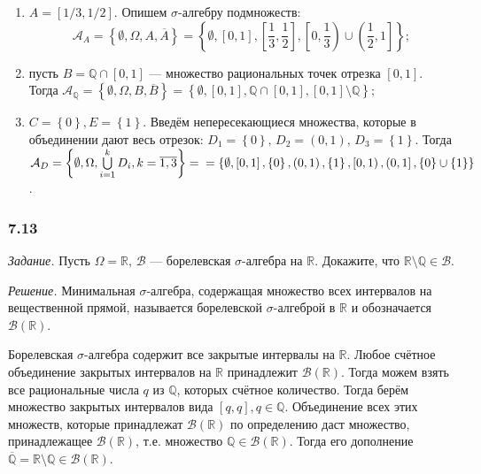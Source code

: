 \begin{enumerate}[label=\alph*)]
\item $A = \left[ 1/3, 1/2 \right] $.
Опишем $ \sigma $-алгебру подмножеств:
$$ \mathcal{A}_A =
\left\{ \emptyset, \Omega, A, \overline{A} \right\} =
\left\{ \emptyset, \left[ 0, 1 \right],
\left[ \frac{1}{3}, \frac{1}{2} \right], \left[ 0, \frac{1}{3} \right) \cup \left( \frac{1}{2}, 1 \right] \right\};$$
\item пусть $B = \mathbb{Q} \cap \left[ 0, 1 \right] $ --- множество рациональных точек отрезка $ \left[ 0, 1 \right] $.
Тогда
$ \mathcal{A}_{ \mathbb{Q} } =
\left\{ \emptyset, \Omega, B, \overline{B} \right\} =
\left\{ \emptyset, \left[ 0, 1 \right], \mathbb{Q} \cap \left[ 0, 1 \right], \left[ 0, 1 \right] \setminus \mathbb{Q} \right\};$
\item $C = \left\{ 0 \right\}, E = \left\{ 1 \right\} $.
Введём непересекающиеся множества,
которые в объединении дают весь отрезок: $D_1 = \left\{ 0 \right\}, \, D_2 = \left( 0, 1 \right), \, D_3 = \left\{ 1 \right\} $.
Тогда
$ \mathcal{A}_D =
\left\{ \emptyset, \Omega, \bigcup \limits_{i=1}^k D_i, k = \overline{1, 3} \right\} = \\
= \left\{ \emptyset, \left[0, 1 \right], \left\{ 0 \right\}, \left( 0, 1 \right),
\left\{ 1 \right\}, \left[0, 1 \right), \left(0, 1 \right], \left\{ 0 \right\} \cup \left\{ 1 \right\} \right\} $.
\end{enumerate}

\subsubsection*{7.13}

\textit{Задание.} Пусть $ \Omega = \mathbb{R}, \, \mathcal{B} $ --- борелевская $ \sigma $-алгебра на $ \mathbb{R} $.
Докажите, что $ \mathbb{R} \setminus \mathbb{Q} \in \mathcal{B} $.

\textit{Решение.} Минимальная $ \sigma $-алгебра,
содержащая множество всех интервалов на вещественной прямой,
называется борелевской $ \sigma $-алгеброй в $ \mathbb{R} $ и обозначается $ \mathcal{B} \left( \mathbb{R} \right) $.

Борелевская $ \sigma $-алгебра содержит все закрытые интервалы на $ \mathbb{R} $.
Любое счётное объединение закрытых интервалов на $ \mathbb{R} $ принадлежит $ \mathcal{B} \left( \mathbb{R} \right) $.
Тогда можем взять все рациональные числа $q$ из $ \mathbb{Q} $, которых счётное количество.
Тогда берём множество закрытых интервалов вида $ \left[ q, q \right], q \in \mathbb{Q} $.
Объединение всех этих множеств,
которые принадлежат $ \mathcal{B} \left( \mathbb{R} \right) $ по определению даст множество,
принадлежащее $ \mathcal{B} \left( \mathbb{R} \right) $, т.е. множество $ \mathbb{Q} \in \mathcal{B} \left( \mathbb{R} \right) $.
Тогда его дополнение $ \overline{ \mathbb{Q} } = \mathbb{R} \setminus \mathbb{Q} \in \mathcal{B} \left( \mathbb{R} \right) $.

